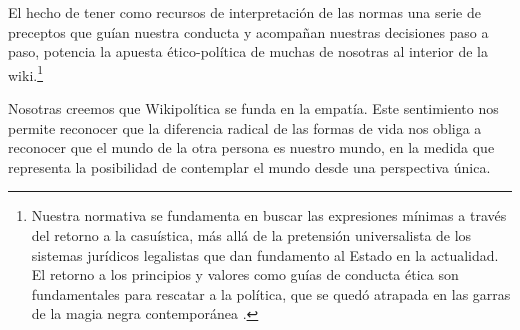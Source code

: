 El hecho de tener como recursos de interpretación de las normas una
serie de preceptos que guían nuestra conducta y acompañan nuestras
decisiones paso a paso, potencia la apuesta ético-política de muchas de
nosotras al interior de la wiki.\footnote{Nuestra normativa se
  fundamenta en buscar las expresiones mínimas a través del retorno a la
  casuística, más allá de la pretensión universalista de los sistemas
  jurídicos legalistas que dan fundamento al Estado en la actualidad. El
  retorno a los principios y valores como guías de conducta ética son
  fundamentales para rescatar a la política, que se quedó atrapada en
  las garras de la magia negra
  contemporánea \cite{Tiqqun2013}.}

Nosotras creemos que Wikipolítica se funda en la empatía. Este
sentimiento nos permite reconocer que la diferencia radical de las
formas de vida nos obliga a reconocer que el mundo de la otra persona es
nuestro mundo, en la medida que representa la posibilidad de contemplar
el mundo desde una perspectiva única.
